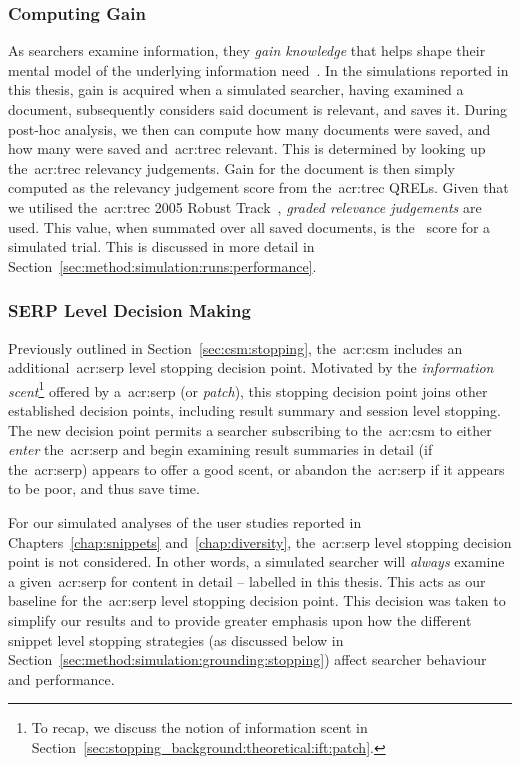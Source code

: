 \subsubsection{Computing Gain}\label{sec:method:simulation:grounding:gain}
As searchers examine information, they \emph{gain knowledge} that helps shape their mental model of the underlying information need~\citep{nickles1995judgment}. In the simulations reported in this thesis, gain is acquired when a simulated searcher, having examined a document, subsequently considers said document is relevant, and saves it. During post-hoc analysis, we then can compute how many documents were saved, and how many were saved and~\gls{acr:trec} relevant. This is determined by looking up the~\gls{acr:trec} relevancy judgements. Gain for the document is then simply computed as the relevancy judgement score from the~\gls{acr:trec} QRELs. Given that we utilised the~\gls{acr:trec} 2005 Robust Track~\citep{voorhees2005trec_book}, \emph{graded relevance judgements} are used. This value, when summated over all saved documents, is the~ score for a simulated trial. This is discussed in more detail in Section~\ref{sec:method:simulation:runs:performance}.

\vspace*{-2mm}
\subsubsection{SERP Level Decision Making}\label{sec:method:simulation:grounding:serp}
Previously outlined in Section~\ref{sec:csm:stopping}, the~\gls{acr:csm} includes an additional~\gls{acr:serp} level stopping decision point. Motivated by the \emph{information scent}\footnote{To recap, we discuss the notion of information scent in Section~\ref{sec:stopping_background:theoretical:ift:patch}.} offered by a~\gls{acr:serp} (or \emph{patch}), this stopping decision point joins other established decision points, including result summary and session level stopping. The new decision point permits a searcher subscribing to the~\gls{acr:csm} to either \emph{enter} the~\gls{acr:serp} and begin examining result summaries in detail (if the~\gls{acr:serp}) appears to offer a good scent, or abandon the~\gls{acr:serp} if it appears to be poor, and thus save time.

For our simulated analyses of the user studies reported in Chapters~\ref{chap:snippets} and~\ref{chap:diversity}, the~\gls{acr:serp} level stopping decision point is not considered. In other words, a simulated searcher will \emph{always} examine a given~\gls{acr:serp} for content in detail -- labelled  in this thesis. This acts as our baseline for the~\gls{acr:serp} level stopping decision point. This decision was taken to simplify our results and to provide greater emphasis upon how the different snippet level stopping strategies (as discussed below in Section~\ref{sec:method:simulation:grounding:stopping}) affect searcher behaviour and performance.


